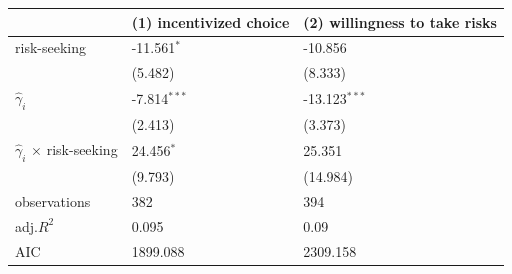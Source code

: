 \begin{tabular}{lll}
\hline
 & (1) incentivized choice & (2) willingness to take risks \\
\hline
risk-seeking & -11.561$^{*}$ & -10.856 \\
 & (5.482) & (8.333) \\
$\hat{\gamma}_i$ & -7.814$^{***}$ & -13.123$^{***}$ \\
 & (2.413) & (3.373) \\
$\hat{\gamma}_i$ $\times$ risk-seeking & 24.456$^{*}$ & 25.351 \\
 & (9.793) & (14.984) \\
observations & 382 & 394 \\
adj.$R^2$ & 0.095 & 0.09 \\
AIC & 1899.088 & 2309.158 \\
\hline
\end{tabular}
